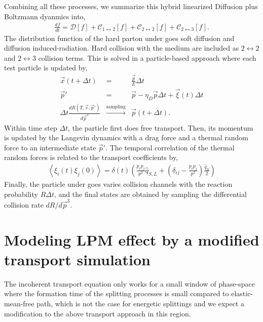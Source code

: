 \documentclass[aps, prc, reprint, amsmath, groupedaddress, nofootinbib]{revtex4-1}
\begin{document}
Combining all these processes, we summarize this hybrid linearized Diffusion plus Boltzmann dyanmics into,
\begin{eqnarray}
\frac{df}{dt} = \mathcal{D}[f] + \mathcal{C}_{1\leftrightarrow 2}[f] + \mathcal{C}_{2\leftrightarrow 2}[f] + \mathcal{C}_{2\leftrightarrow 3}[f].
\end{eqnarray}
The distribution function of the hard parton under goes soft diffusion and diffusion induced-radiation. 
Hard collision with the medium are included as $2\leftrightarrow 2$ and $2\leftrightarrow 3$ collision terms.
This is solved in a particle-based approach where each test particle is updated by,
\begin{eqnarray}
\vec{x}(t+\Delta t) &=& \frac{\vec{p}}{E}\Delta t\\
\vec{p}' &=& \vec{p} - \eta_D \vec{p} \Delta t + \vec{\xi}(t) \Delta t\\
\Delta t\frac{dR(T, \vec{v}, \vec{p}')}{d\vec{p}^3} &\xrightarrow{\textrm{sampling}}& \vec{p}(t+\Delta t).
\end{eqnarray}
Within time step $\Delta t$, the particle first does free transport.
Then, its momentum is updated by the Langevin dynamics with a drag force and a thermal random force to an intermediate state $\vec{p}'$. 
The temporal correlation of the thermal random forces is related to the transport coefficients by,
\begin{eqnarray}
\left\langle\xi_i(t)\xi_j(0)\right\rangle = \delta(t) \left(
\frac{p_i p_j}{p^2}\hat{q}_{S, L} + \left(
\delta_{ij}-\frac{p_i p_j}{p^2}
\right)\frac{\hat{q}_S}{2} 
\right)
\end{eqnarray}
Finally, the particle under goes varies collision channels with the reaction probability $R\Delta t$, and the final states are obtained by sampling the differential collision rate $dR/d\vec{p}^3$.

\section{Modeling LPM effect by a modified transport simulation}\label{section:modified-Boltzmann}
The incoherent transport equation only works for a small window of phase-space where the formation time of the splitting processes is small compared to elastic-mean-free path, which is not the case for energetic splittings and we expect a modification to the above transport approach in this region.
\end{document}
